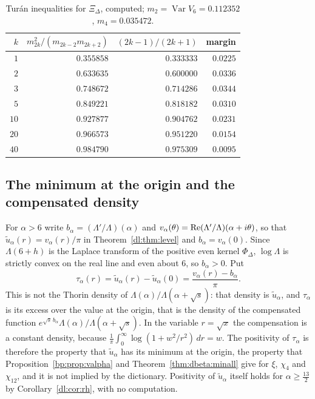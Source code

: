 \begin{table}[htbp]
\centering\small
\begin{tabular}{rrrr}
\toprule
$k$ & $m_{2k}^2/(m_{2k-2}m_{2k+2})$ & $(2k-1)/(2k+1)$ & margin\\
\midrule
$1$ & $0.355858$ & $0.333333$ & $0.0225$\\
$2$ & $0.633635$ & $0.600000$ & $0.0336$\\
$3$ & $0.748672$ & $0.714286$ & $0.0344$\\
$5$ & $0.849221$ & $0.818182$ & $0.0310$\\
$10$ & $0.927877$ & $0.904762$ & $0.0231$\\
$20$ & $0.966573$ & $0.951220$ & $0.0154$\\
$40$ & $0.984790$ & $0.975309$ & $0.0095$\\
\bottomrule
\end{tabular}
\caption{Tur\'an inequalities for $\Xi_\Delta$, computed; $m_2=\operatorname{Var}V_6=0.112352$, $m_4=0.035472$.}\label{dl:tab:turan}
\end{table}

\subsection{The minimum at the origin and the compensated density}\label{dl:sec:minorigin}

For $\alpha>6$ write $b_\alpha=(\Lambda'/\Lambda)(\alpha)$ and $v_\alpha(\theta)=\operatorname{Re}(\Lambda'/\Lambda)(\alpha+i\theta)$, so that $\tilde u_\alpha(r)=v_\alpha(r)/\pi$ in Theorem~\ref{dl:thm:level} and $b_\alpha=v_\alpha(0)$. Since $\Lambda(6+h)$ is the Laplace transform of the positive even kernel $\Phi_\Delta$, $\log\Lambda$ is strictly convex on the real line and even about $6$, so $b_\alpha>0$. Put
\[
\tau_\alpha(r)=\tilde u_\alpha(r)-\tilde u_\alpha(0)=\frac{v_\alpha(r)-b_\alpha}\pi .
\]
This is not the Thorin density of $\Lambda(\alpha)/\Lambda(\alpha+\sqrt s)$: that density is $\tilde u_\alpha$, and $\tau_\alpha$ is its excess over the value at the origin, that is the density of the compensated function $e^{\sqrt s\,b_\alpha}\Lambda(\alpha)/\Lambda(\alpha+\sqrt s)$. In the variable $r=\sqrt x$ the compensation is a constant density, because $\frac1\pi\int_0^\infty\log(1+w^2/r^2)\,dr=w$. The positivity of $\tau_\alpha$ is therefore the property that $\tilde u_\alpha$ has its minimum at the origin, the property that Proposition~\ref{bp:prop:valpha} and Theorem~\ref{thm:dbeta:minall} give for $\xi$, $\chi_4$ and $\chi_{12}$, and it is not implied by the dictionary. Positivity of $\tilde u_\alpha$ itself holds for $\alpha\ge\frac{13}2$ by Corollary~\ref{dl:cor:rh}, with no computation.

